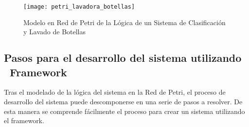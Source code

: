 \begin{figure}[H]
    \centering
    \texttt{[image: petri\_lavadora\_botellas]}
    \caption{Modelo en Red de Petri de la Lógica de un Sistema de Clasificación y
    Lavado de Botellas}
    \label{fig:petri_lavadora_botellas}
\end{figure}

\subsection {Pasos para el desarrollo del sistema utilizando  \\
\nombreFramework \  Framework}
\label{sec:pasos_desarrollo_lavadora_botellas}
Tras el modelado de la lógica del sistema en la Red de Petri, el
proceso de desarrollo del sistema puede descomponerse en una serie de
pasos a resolver.
De esta manera se comprende fácilmente el proceso para crear un sistema
utilizando el framework.

